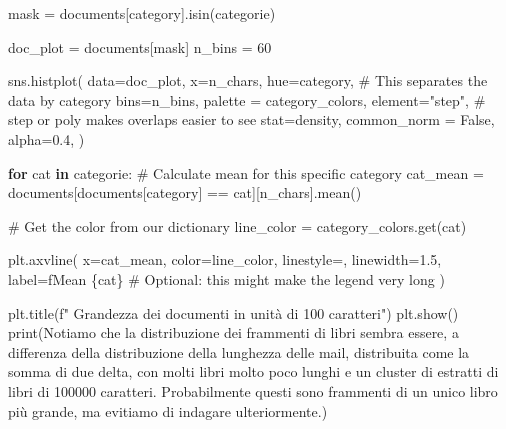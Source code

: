 \documentclass[
  italian,
  a4paper,
]{article}
\newenvironment{Shaded}{\begin{snugshade}}{\end{snugshade}}
\newcommand{\BuiltInTok}[1]{\textcolor[rgb]{0.00,0.23,0.31}{#1}}
\newcommand{\CommentTok}[1]{\textcolor[rgb]{0.37,0.37,0.37}{#1}}
\newcommand{\ControlFlowTok}[1]{\textcolor[rgb]{0.00,0.23,0.31}{\textbf{#1}}}
\newcommand{\DecValTok}[1]{\textcolor[rgb]{0.68,0.00,0.00}{#1}}
\newcommand{\FloatTok}[1]{\textcolor[rgb]{0.68,0.00,0.00}{#1}}
\newcommand{\KeywordTok}[1]{\textcolor[rgb]{0.00,0.23,0.31}{\textbf{#1}}}
\newcommand{\NormalTok}[1]{\textcolor[rgb]{0.00,0.23,0.31}{#1}}
\newcommand{\OperatorTok}[1]{\textcolor[rgb]{0.37,0.37,0.37}{#1}}
\newcommand{\SpecialCharTok}[1]{\textcolor[rgb]{0.37,0.37,0.37}{#1}}
\newcommand{\SpecialStringTok}[1]{\textcolor[rgb]{0.13,0.47,0.30}{#1}}
\newcommand{\StringTok}[1]{\textcolor[rgb]{0.13,0.47,0.30}{#1}}
\newcommand{\VariableTok}[1]{\textcolor[rgb]{0.07,0.07,0.07}{#1}}
\begin{document}
\begin{Shaded}
\begin{Highlighting}[]
\NormalTok{mask }\OperatorTok{=}\NormalTok{ documents[}\StringTok{\textquotesingle{}category\textquotesingle{}}\NormalTok{].isin(categorie)}

\NormalTok{doc\_plot }\OperatorTok{=}\NormalTok{ documents[mask]}
\NormalTok{n\_bins }\OperatorTok{=} \DecValTok{60}

\NormalTok{sns.histplot(}
\NormalTok{    data}\OperatorTok{=}\NormalTok{doc\_plot, }
\NormalTok{    x}\OperatorTok{=}\StringTok{\textquotesingle{}n\_chars\textquotesingle{}}\NormalTok{, }
\NormalTok{    hue}\OperatorTok{=}\StringTok{\textquotesingle{}category\textquotesingle{}}\NormalTok{,     }\CommentTok{\# This separates the data by category}
\NormalTok{    bins}\OperatorTok{=}\NormalTok{n\_bins, }
\NormalTok{    palette }\OperatorTok{=}\NormalTok{ category\_colors, }
\NormalTok{    element}\OperatorTok{=}\StringTok{"step"}\NormalTok{,     }\CommentTok{\# \textquotesingle{}step\textquotesingle{} or \textquotesingle{}poly\textquotesingle{} makes overlaps easier to see}
\NormalTok{    stat}\OperatorTok{=}\StringTok{\textquotesingle{}density\textquotesingle{}}\NormalTok{,}
\NormalTok{    common\_norm }\OperatorTok{=} \VariableTok{False}\NormalTok{, }
\NormalTok{    alpha}\OperatorTok{=}\FloatTok{0.4}\NormalTok{,}
\NormalTok{)}

\ControlFlowTok{for}\NormalTok{ cat }\KeywordTok{in}\NormalTok{ categorie:}
    \CommentTok{\# Calculate mean for this specific category}
\NormalTok{    cat\_mean }\OperatorTok{=}\NormalTok{ documents[documents[}\StringTok{\textquotesingle{}category\textquotesingle{}}\NormalTok{] }\OperatorTok{==}\NormalTok{ cat][}\StringTok{\textquotesingle{}n\_chars\textquotesingle{}}\NormalTok{].mean()}
    
    \CommentTok{\# Get the color from our dictionary}
\NormalTok{    line\_color }\OperatorTok{=}\NormalTok{ category\_colors.get(cat)}
    
\NormalTok{    plt.axvline(}
\NormalTok{        x}\OperatorTok{=}\NormalTok{cat\_mean, }
\NormalTok{        color}\OperatorTok{=}\NormalTok{line\_color, }
\NormalTok{        linestyle}\OperatorTok{=}\StringTok{\textquotesingle{}{-}{-}\textquotesingle{}}\NormalTok{, }
\NormalTok{        linewidth}\OperatorTok{=}\FloatTok{1.5}\NormalTok{,}
\NormalTok{        label}\OperatorTok{=}\SpecialStringTok{f\textquotesingle{}Mean }\SpecialCharTok{\{}\NormalTok{cat}\SpecialCharTok{\}}\SpecialStringTok{\textquotesingle{}} \CommentTok{\# Optional: this might make the legend very long}
\NormalTok{    )}

\NormalTok{plt.title(}\SpecialStringTok{f" Grandezza dei documenti in unità di 100 caratteri"}\NormalTok{)}
\NormalTok{plt.show()}
\BuiltInTok{print}\NormalTok{(}\StringTok{\textquotesingle{}Notiamo che la distribuzione dei frammenti di libri sembra essere, a differenza della distribuzione della lunghezza delle mail, distribuita come la somma di due delta, con molti libri molto poco lunghi e un cluster di estratti di libri di 100000 caratteri. Probabilmente questi sono frammenti di un unico libro più grande, ma evitiamo di indagare ulteriormente.\textquotesingle{}}\NormalTok{)}


\end{Highlighting}
\end{Shaded}
\end{document}
